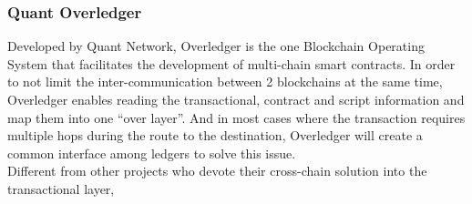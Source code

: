 \subsubsection{Quant Overledger}
\noindent Developed by Quant Network, Overledger is the one Blockchain Operating System that facilitates the development of multi-chain smart contracts\cite{verdian2018quant}. In order to not limit the inter-communication between 2 blockchains at the same time, Overledger enables reading the transactional, contract and script information and map them into one ``over layer''. And in most cases where the transaction requires multiple hops during the route to the destination, Overledger will create a common interface among ledgers to solve this issue.\\
\noindent Different from other projects who devote their cross-chain solution into the transactional layer,



